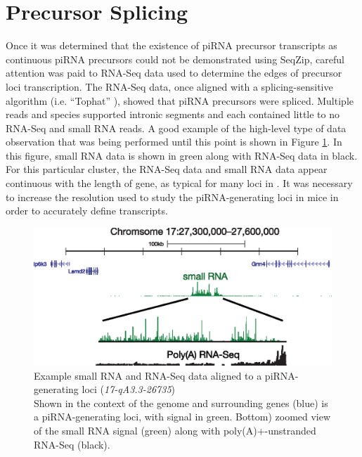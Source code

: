 \section{Precursor Splicing}
  \label{SeqZipMethod:sec:piRNA precursors are spliced}

  Once it was determined that the existence of piRNA precursor transcripts as continuous piRNA precursors could not be demonstrated using SeqZip, careful attention was paid to RNA-Seq data used to determine the edges of precursor loci transcription. The RNA-Seq data, once aligned with a splicing-sensitive algorithm (i.e. ``Tophat'' \citep{Trapnell2009}), showed that piRNA precursors were spliced. Multiple reads and species supported intronic segments and each contained little to no RNA-Seq and small RNA reads. A good example of the high-level type of data observation that was being performed until this point is shown in Figure \ref{SeqZipMethod:fig:evidence for precusor splicing}. In this figure, small RNA data is shown in green along with RNA-Seq data in black. For this particular cluster, the RNA-Seq data and small RNA data appear continuous with the length of gene, as typical for many loci in \flies{}. It was necessary to increase the resolution used to study the piRNA-generating loci in mice in order to accurately define transcripts.

  \begin{figure} %
    \centering 
    \includegraphics{Figures/SeqZipMethod/evidenceForPrecursorSplicing.eps}
    \caption[Example small RNA and RNA-Seq data aligned to a piRNA-generating loci]
    {
      Example small RNA and RNA-Seq data aligned to a piRNA-generating loci (\textit{17-qA3.3-26735})\\[0.25cm]
      Shown in the context of the genome and surrounding genes (blue) is a piRNA-generating loci, with signal in green. Bottom) zoomed view of the small RNA signal (green) along with poly(A)+-unstranded RNA-Seq (black).
      }
    \label{SeqZipMethod:fig:evidence for precusor splicing}
    \end{figure}

